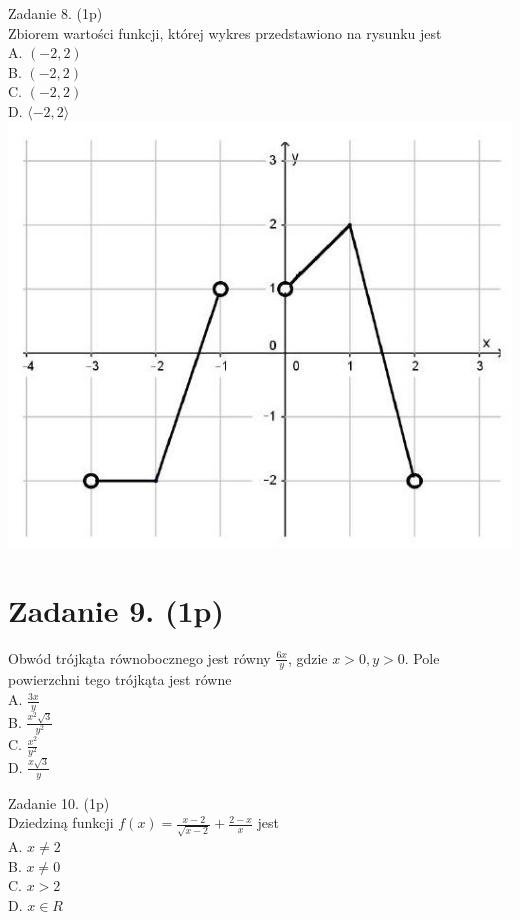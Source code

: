 \documentclass[10pt]{article}
\begin{document}
Zadanie 8. (1p)\\
Zbiorem wartości funkcji, której wykres przedstawiono na rysunku jest\\
A. \((-2,2)\)\\
B. \((-2,2)\)\\
C. \((-2,2)\)\\
D. \(\langle-2,2\rangle\)\\
\includegraphics[max width=\textwidth, center]{2024_11_21_cce9c7ad32a1dbcd58dag-04(1)}

\section*{Zadanie 9. (1p)}
Obwód trójkąta równobocznego jest równy \(\frac{6 x}{y}\), gdzie \(x>0, y>0\). Pole powierzchni tego trójkąta jest równe\\
A. \(\frac{3 x}{y}\)\\
B. \(\frac{x^{2} \sqrt{3}}{y^{2}}\)\\
C. \(\frac{x^{2}}{y^{2}}\)\\
D. \(\frac{x \sqrt{3}}{y}\)

Zadanie 10. (1p)\\
Dziedziną funkcji \(f(x)=\frac{x-2}{\sqrt{x-2}}+\frac{2-x}{x}\) jest\\
A. \(x \neq 2\)\\
B. \(x \neq 0\)\\
C. \(x>2\)\\
D. \(x \in R\)
\end{document}
